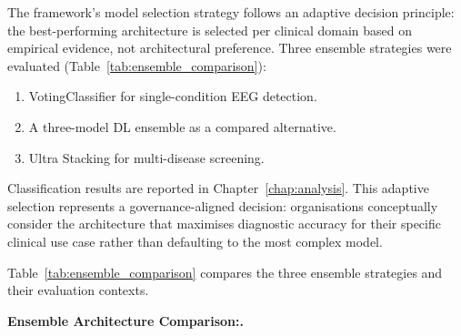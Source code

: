 The framework's model selection strategy follows an adaptive decision principle: the best-performing architecture is selected per clinical domain based on empirical evidence, not architectural preference. Three ensemble strategies were evaluated (Table~\ref{tab:ensemble_comparison}):
\begin{enumerate}[leftmargin=*, itemsep=1pt, label=(\arabic*)]
    \item VotingClassifier for single-condition EEG detection.
    \item A three-model DL ensemble as a compared alternative.
    \item Ultra Stacking for multi-disease screening.
\end{enumerate}
\noindent Classification results are reported in Chapter~\ref{chap:analysis}. This adaptive selection represents a governance-aligned decision: organisations conceptually consider the architecture that maximises diagnostic accuracy for their specific clinical use case rather than defaulting to the most complex model.

Table~\ref{tab:ensemble_comparison} compares the three ensemble strategies and their evaluation contexts.


\noindent\textbf{Ensemble Architecture Comparison:.}

